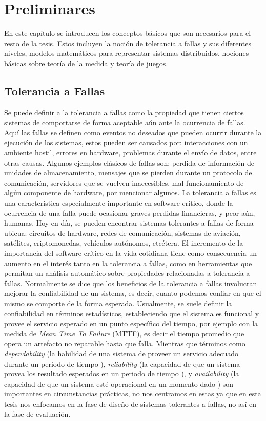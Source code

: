 \chapter{Preliminares}
\label{cap:preliminares}

En este capítulo se introducen los conceptos básicos que son necesarios para el resto de la tesis. Estos incluyen la noción de tolerancia a fallas y sus diferentes niveles, modelos matemáticos para representar sistemas distribuidos, nociones básicas sobre teoría de la medida y teoría de juegos.

\section{Tolerancia a Fallas}
Se puede definir a la tolerancia a fallas como la propiedad que tienen ciertos sistemas de comportarse de forma aceptable aún ante la ocurrencia de fallas. Aquí las fallas se definen como eventos no deseados que pueden ocurrir durante la ejecución de los sistemas, estos pueden ser causados por:  interacciones con un ambiente hostil, errores en hardware, problemas durante el envío de datos, entre otras causas. Algunos ejemplos clásicos de fallas son: perdida de información de unidades de almacenamiento, mensajes que se pierden durante un protocolo de comunicación, servidores que se vuelven  inaccesibles, mal funcionamiento de algún componente de hardware,  por mencionar algunos.
La tolerancia a fallas es una característica especialmente importante en software crítico, donde la ocurrencia de una falla puede ocasionar graves perdidas financieras, y peor aún, humanas.
Hoy en día, se pueden encontrar sistemas tolerantes a fallas de forma ubicua: circuitos de hardware, redes de comunicación, sistemas de aviación, satélites, criptomonedas, vehículos autónomos, etcétera.
El incremento de la importancia del software crítico en la vida cotidiana tiene como consecuencia un aumento en el interés tanto en la tolerancia a fallas, como en herramientas que permitan un análisis automático sobre propiedades relacionadas a tolerancia a fallas.
Normalmente se dice que los beneficios de la tolerancia a fallas involucran mejorar la confiabilidad de un sistema, es decir, cuanto podemos confiar en que el mismo se comporte de la forma esperada. Usualmente, se suele definir la confiabilidad en términos estadísticos, estableciendo que el sistema es funcional y provee el servicio esperado en un punto específico del tiempo, por ejemplo con la medida de \textit{Mean Time To Failure} 
 (MTTF), es decir el tiempo promedio que opera un artefacto no reparable hasta que falla. Mientras que términos como
\textit{dependability} (la habilidad de una sistema de proveer un servicio adecuado durante un periodo de tiempo \cite{Avizienis2004}), \textit{reliability} (la capacidad de que un sistema provea los resultado esperados en un periodo de tiempo \cite{Avizienis2004} ), y \textit{availability} (la capacidad de que un sistema esté operacional en un momento dado \cite{Avizienis2004}) son importantes en circunstancias prácticas,
no nos centramos en estas ya que en esta tesis nos enfocamos en la fase de diseño de sistemas tolerantes a fallas, no así en la fase de evaluación.

